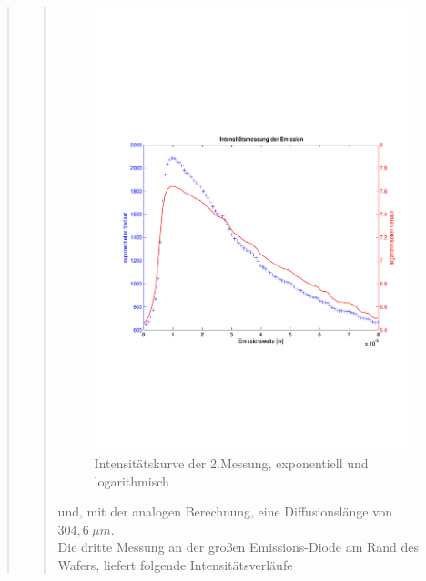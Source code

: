 \begin{quote}
\begin{quote}
        \begin{figure}[H]
                    \centering
                        \includegraphics[scale=0.53, trim = 1cm 6cm 1.5cm 8cm,
                        clip]{./Emissionsbilder/zwei/Intensitat_2.pdf}
                        \caption{Intensitätskurve der 2.Messung, exponentiell
                        und logarithmisch}
                            \label{fig:./Emissionsbilder/zwei/Intensitat_2.pdf}
        \end{figure}

        und, mit der analogen Berechnung, eine Diffusionslänge von $304,6\ \mu
        m$.\\

        Die dritte Messung an der großen Emissions-Diode am Rand des Wafers,
        liefert folgende Intensitätsverläufe


\end{quote}
\end{quote}
